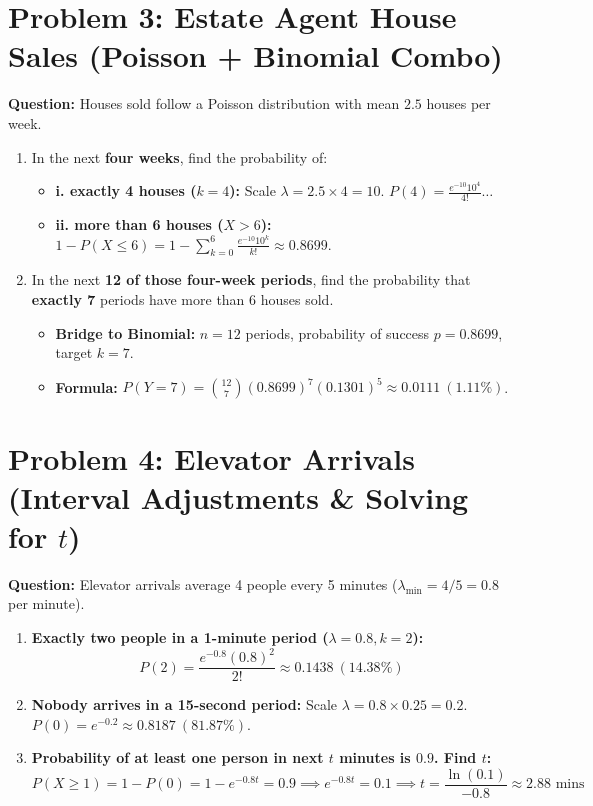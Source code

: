 \documentclass[11pt,a4paper]{article}
\begin{document}
\section*{Problem 3: Estate Agent House Sales (Poisson + Binomial Combo)}
\textbf{Question:} Houses sold follow a Poisson distribution with mean $2.5$ houses per week.
\begin{enumerate}
    \item[a)] In the next \textbf{four weeks}, find the probability of:
    \begin{itemize}
        \item \textbf{i. exactly 4 houses ($k=4$):} Scale $\lambda = 2.5 \times 4 = 10$. $P(4) = \frac{e^{-10}10^4}{4!} \dots$
        \item \textbf{ii. more than 6 houses ($X > 6$):} $1 - P(X \le 6) = 1 - \sum_{k=0}^{6} \frac{e^{-10}10^k}{k!} \approx \mathbf{0.8699}$.
    \end{itemize}
    \item[b)] In the next \textbf{12 of those four-week periods}, find the probability that \textbf{exactly 7} periods have more than 6 houses sold.
    \begin{itemize}
        \item \textbf{Bridge to Binomial:} $n = 12$ periods, probability of success $p = 0.8699$, target $k = 7$.
        \item \textbf{Formula:} $P(Y = 7) = \binom{12}{7} (0.8699)^7 (0.1301)^5 \approx \mathbf{0.0111} \ (1.11\%)$.
    \end{itemize}
\end{enumerate}

\section*{Problem 4: Elevator Arrivals (Interval Adjustments \& Solving for $t$)}
\textbf{Question:} Elevator arrivals average 4 people every 5 minutes ($\lambda_{\text{min}} = 4/5 = 0.8$ per minute).
\begin{enumerate}
    \item[\textbf{(i)}] \textbf{Exactly two people in a 1-minute period ($\lambda = 0.8, k=2$):}
    $$P(2) = \frac{e^{-0.8}(0.8)^2}{2!} \approx \mathbf{0.1438} \ (14.38\%)$$
    \item[\textbf{(ii)}] \textbf{Nobody arrives in a 15-second period:}
    Scale $\lambda = 0.8 \times 0.25 = 0.2$. $P(0) = e^{-0.2} \approx \mathbf{0.8187} \ (81.87\%)$.
    \item[\textbf{(iii)}] \textbf{Probability of at least one person in next $t$ minutes is $0.9$. Find $t$:}
    $$P(X \ge 1) = 1 - P(0) = 1 - e^{-0.8t} = 0.9 \implies e^{-0.8t} = 0.1 \implies t = \frac{\ln(0.1)}{-0.8} \approx \mathbf{2.88} \text{ mins}$$
\end{enumerate}
\end{document}
